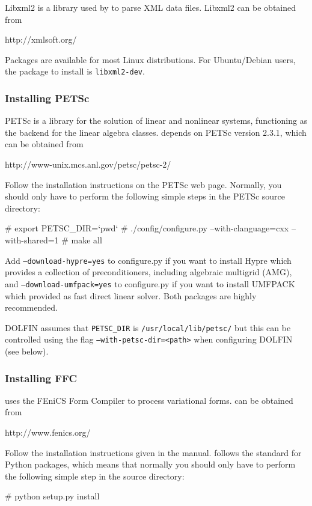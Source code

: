 Libxml2 is a library used by \dolfin{} to parse XML data files. Libxml2 can be
obtained from
\begin{code}
  http://xmlsoft.org/
\end{code}
Packages are available for most Linux distributions. For Ubuntu/Debian users, the 
package to install is \texttt{libxml2-dev}.

\subsubsection{Installing PETSc}

PETSc is a library for the solution of linear and nonlinear systems, functioning
as the backend for the \dolfin{} linear algebra classes. \dolfin{} depends on 
PETSc version 2.3.1, which can be obtained from
\begin{code}
  http://www-unix.mcs.anl.gov/petsc/petsc-2/
\end{code}

Follow the installation instructions on the PETSc web page. Normally,
you should only have to perform the following simple steps in the PETSc
source directory:
\begin{code}
  # export PETSC_DIR=`pwd`
  # ./config/configure.py --with-clanguage=cxx --with-shared=1
  # make all
\end{code}

Add \texttt{--download-hypre=yes} to configure.py if you want to
install Hypre which provides a collection of preconditioners,
including algebraic multigrid (AMG), and 
\texttt{--download-umfpack=yes} to configure.py if you want to
install UMFPACK which provided as fast direct linear solver.
Both packages are highly recommended.

DOLFIN assumes that \texttt{PETSC\_DIR} is \texttt{/usr/local/lib/petsc/} but
this can be controlled using the flag \texttt{--with-petsc-dir=<path>} when 
configuring DOLFIN (see below).

\subsubsection{Installing FFC}

\dolfin{} uses the FEniCS Form Compiler \ffc{} to process variational
forms. \ffc{} can be obtained from
\begin{code}
  http://www.fenics.org/
\end{code}

Follow the installation instructions given in the \ffc{}
manual. \ffc{} follows the standard for Python packages, which means
that normally you should only have to perform the following simple step
in the \ffc{} source directory:
\begin{code}
  # python setup.py install
\end{code}

